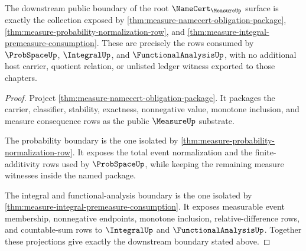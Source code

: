 \begin{theorem}
\label{thm:measure-root-namecert-downstream-boundary}
The downstream public boundary of the root $\NameCert_{\MeasureUp}$ surface is
exactly the collection exposed by
\autoref{thm:measure-namecert-obligation-package},
\autoref{thm:measure-probability-normalization-row}, and
\autoref{thm:measure-integral-premeasure-consumption}. These are precisely the
rows consumed by $\ProbSpaceUp$, $\IntegralUp$, and
$\FunctionalAnalysisUp$, with no additional host carrier, quotient relation, or
unlisted ledger witness exported to those chapters.
\end{theorem}
\begin{proof}
Project \autoref{thm:measure-namecert-obligation-package}. It packages the
carrier, classifier, stability, exactness, nonnegative value, monotone
inclusion, and measure consequence rows as the public $\MeasureUp$ substrate.

The probability boundary is the one isolated by
\autoref{thm:measure-probability-normalization-row}. It exposes the total
event normalization and the finite-additivity rows used by $\ProbSpaceUp$,
while keeping the remaining measure witnesses inside the named package.

The integral and functional-analysis boundary is the one isolated by
\autoref{thm:measure-integral-premeasure-consumption}. It exposes measurable
event membership, nonnegative endpoints, monotone inclusion,
relative-difference rows, and countable-sum rows to $\IntegralUp$ and
$\FunctionalAnalysisUp$. Together these projections give exactly the
downstream boundary stated above.
\end{proof}
